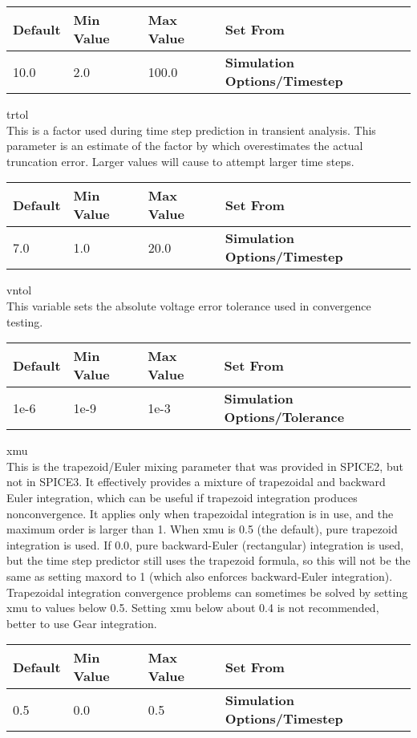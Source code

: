\begin{description}
\begin{tabular}{|l|l|l|l|}\hline
\bf Default & \bf Min Value & \bf Max Value & \bf Set From\\ \hline
10.0 & 2.0 & 100.0 & \bf Simulation Options/Timestep\\ \hline
\end{tabular}

\item{\et trtol}\\
This is a factor used during time step prediction in transient
analysis.  This parameter is an estimate of the factor by which
{\WRspice} overestimates the actual truncation error.  Larger values
will cause {\WRspice} to attempt larger time steps.

\begin{tabular}{|l|l|l|l|}\hline
\bf Default & \bf Min Value & \bf Max Value & \bf Set From\\ \hline
7.0 & 1.0 & 20.0 & \bf Simulation Options/Timestep\\ \hline
\end{tabular}

\item{\et vntol}\\
This variable sets the absolute voltage error tolerance used in
convergence testing.

\begin{tabular}{|l|l|l|l|}\hline
\bf Default & \bf Min Value & \bf Max Value & \bf Set From\\ \hline
1e-6 & 1e-9 & 1e-3 & \bf Simulation Options/Tolerance\\ \hline
\end{tabular}
     
\item{\et xmu}\\
This is the trapezoid/Euler mixing parameter that was provided in
SPICE2, but not in SPICE3.  It effectively provides a mixture of
trapezoidal and backward Euler integration, which can be useful if
trapezoid integration produces nonconvergence.  It applies only when
trapezoidal integration is in use, and the maximum order is larger
than 1.  When {\et xmu} is 0.5 (the default), pure trapezoid
integration is used.  If 0.0, pure backward-Euler (rectangular)
integration is used, but the time step predictor still uses the
trapezoid formula, so this will not be the same as setting {\et
maxord} to 1 (which also enforces backward-Euler integration). 
Trapezoidal integration convergence problems can sometimes be solved
by setting {\et xmu} to values below 0.5.  Setting {\et xmu} below
about 0.4 is not recommended, better to use Gear integration.

\begin{tabular}{|l|l|l|l|}\hline
\bf Default & \bf Min Value & \bf Max Value & \bf Set From\\ \hline
0.5 & 0.0 & 0.5 & \bf Simulation Options/Timestep\\ \hline
\end{tabular}
\end{description}

